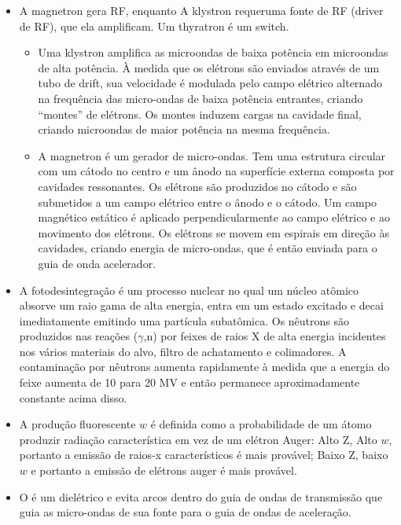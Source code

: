 \documentclass[11pt,a4paper]{article}
\begin{document}
\begin{itemize}
    \item A magnetron gera RF, enquanto A klystron requeruma fonte de RF (driver de RF), que ela amplificam. Um thyratron é um switch.
    
        \begin{itemize}
            \item Uma klystron amplifica as microondas de baixa potência em microondas de alta potência. À medida que os elétrons são enviados através de um tubo de drift, sua velocidade é modulada pelo campo elétrico alternado na frequência das micro-ondas de baixa potência entrantes, criando “montes” de elétrons. Os montes induzem cargas na cavidade final, criando microondas de maior potência na mesma frequência.
            
            \item A magnetron é um gerador de micro-ondas. Tem uma estrutura circular com um cátodo no centro e um ânodo na superfície externa composta por cavidades ressonantes. Os elétrons são produzidos no cátodo e são submetidos a um campo elétrico entre o ânodo e o cátodo. Um campo magnético estático é aplicado perpendicularmente ao campo elétrico e ao movimento dos elétrons. Os elétrons se movem em espirais em direção às cavidades, criando energia de micro-ondas, que é então enviada para o guia de onda acelerador.
        \end{itemize}
    
    \item A fotodesintegração é um processo nuclear no qual um núcleo atômico absorve um raio gama de alta energia, entra em um estado excitado e decai imediatamente emitindo uma partícula subatômica. Os nêutrons são produzidos nas reações ($\gamma$,n) por feixes de raios X de alta energia incidentes nos vários materiais do alvo, filtro de achatamento e colimadores. A contaminação por nêutrons aumenta rapidamente à medida que a energia do feixe aumenta de 10 para 20 MV e então permanece aproximadamente constante acima disso.
    
    \item A produção fluorescente $w$ é definida como a probabilidade de um átomo produzir radiação característica em vez de um elétron Auger: Alto Z, Alto $w$, portanto a emissão de raios-x característicos é mais provável; Baixo Z, baixo $w$ e portanto a emissão de elétrons auger é mais provável. 
    
    \item O  é um dielétrico e evita arcos dentro do guia de ondas de transmissão que guia as micro-ondas de sua fonte para o guia de ondas de aceleração.
    

\end{itemize}
\end{document}
